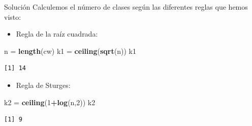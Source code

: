 \documentclass[
  ignorenonframetext,
]{beamer}
\newenvironment{Shaded}{\begin{snugshade}}{\end{snugshade}}
\newcommand{\DecValTok}[1]{\textcolor[rgb]{0.00,0.00,0.81}{#1}}
\newcommand{\FunctionTok}[1]{\textcolor[rgb]{0.13,0.29,0.53}{\textbf{#1}}}
\newcommand{\NormalTok}[1]{#1}
\newcommand{\OtherTok}[1]{\textcolor[rgb]{0.56,0.35,0.01}{#1}}
\newcommand{\SpecialCharTok}[1]{\textcolor[rgb]{0.81,0.36,0.00}{\textbf{#1}}}
\providecommand{\tightlist}{%
  \setlength{\itemsep}{0pt}\setlength{\parskip}{0pt}}
\begin{document}
\begin{frame}[fragile]{Solución}
\label{soluciuxf3n-1}
Calculemos el número de clases según las diferentes reglas que hemos
visto:

\begin{itemize}
\tightlist
\item
  Regla de la raíz cuadrada:
\end{itemize}

\begin{Shaded}
\begin{Highlighting}[]
\NormalTok{n }\OtherTok{=} \FunctionTok{length}\NormalTok{(cw)}
\NormalTok{k1 }\OtherTok{=} \FunctionTok{ceiling}\NormalTok{(}\FunctionTok{sqrt}\NormalTok{(n))}
\NormalTok{k1}
\end{Highlighting}
\end{Shaded}

\begin{verbatim}
[1] 14
\end{verbatim}

\begin{itemize}
\tightlist
\item
  Regla de Sturges:
\end{itemize}

\begin{Shaded}
\begin{Highlighting}[]
\NormalTok{k2 }\OtherTok{=} \FunctionTok{ceiling}\NormalTok{(}\DecValTok{1}\SpecialCharTok{+}\FunctionTok{log}\NormalTok{(n,}\DecValTok{2}\NormalTok{))}
\NormalTok{k2}
\end{Highlighting}
\end{Shaded}

\begin{verbatim}
[1] 9
\end{verbatim}
\end{frame}
\end{document}
